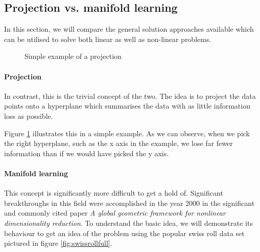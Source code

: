 \clearpage

\subsection{Projection vs. manifold learning}

In this section, we will compare the general solution approaches available which can be utilised to solve both linear as well as non-linear problems. \cite{HandsOnMLCh8}


\renewcommand{\tikzscale}{0.33}
\begin{figure}
	\vspace*{-8mm}
	\centering
	
	\captionsetup{justification=centering}
	\caption{Simple example of a projection}
    \label{fig:projectionExample}
\end{figure}

\paragraph{Projection} In contrast, this is the trivial concept of the two. The idea is to project the data points onto a \gls{hyperplane} which summarises the data with as little information loss as possible.

Figure \ref{fig:projectionExample} illustrates this in a simple example.
As we can observe, when we pick the right \gls{hyperplane}, such as the x axis in the example, we lose far fewer information than if we would have picked the y axis.


\paragraph{Manifold learning} This concept is significantly more difficult to get a hold of.
Significant breakthroughs \cite{ma2012manifold} in this field were accomplished in the year 2000 in the significant and commonly cited paper \emph{A global geometric framework for nonlinear dimensionality reduction}. \cite{tenenbaum2000global}
To understand the basic idea, we will demonstrate its behaviour to get an idea of the problem using the popular swiss roll data set pictured in figure \ref{fig:swissrollfull}.


